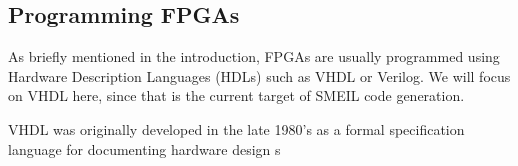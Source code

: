 \subsection{Programming FPGAs}
As briefly mentioned in the introduction, FPGAs are usually programmed using
Hardware Description Languages (HDLs) such as VHDL or Verilog. We will focus on
VHDL here, since that is the current target of SMEIL code generation.

VHDL was originally developed in the late 1980's as a formal specification
language for documenting hardware design s


